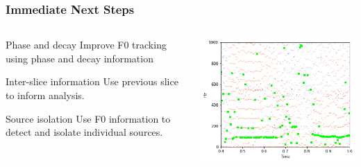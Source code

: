 \begin{frame}
\begin{columns}
\begin{column}{0.5\textwidth}
		\end{column}
	\end{columns}			
\end{frame}

\begin{frame}
\frametitle{Immediate Next Steps}
	\begin{columns}
		\begin{column}{0.5\textwidth}
			\begin{block}{Phase and decay}	
				Improve F0 tracking using phase and decay information
			\end{block}
			\begin{block}{Inter-slice information}
				Use previous slice to inform analysis. 
			\end{block}
			\begin{block}{Source isolation}
				Use F0 information to detect and isolate individual sources.
			\end{block}
		\end{column}
		\begin{column}{0.5\textwidth}
			\includegraphics[width=\textwidth]{images/f0-voice.png}
		\end{column}
	\end{columns}			
\end{frame}
